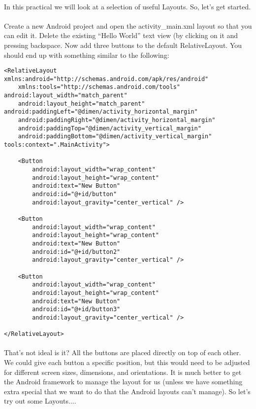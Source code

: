 \paragraph{} In this practical we will look at a selection of useful Layouts. So, let's get started.

\paragraph{} Create a new Android project and open the activity\_main.xml layout so that you can edit it. Delete the existing ``Hello World'' text view (by clicking on it and pressing backspace. Now add three buttons to the default RelativeLayout. You should end up with something similar to the following:

\begin{lstlisting}
<RelativeLayout xmlns:android="http://schemas.android.com/apk/res/android"
    xmlns:tools="http://schemas.android.com/tools" android:layout_width="match_parent"
    android:layout_height="match_parent" android:paddingLeft="@dimen/activity_horizontal_margin"
    android:paddingRight="@dimen/activity_horizontal_margin"
    android:paddingTop="@dimen/activity_vertical_margin"
    android:paddingBottom="@dimen/activity_vertical_margin" tools:context=".MainActivity">

    <Button
        android:layout_width="wrap_content"
        android:layout_height="wrap_content"
        android:text="New Button"
        android:id="@+id/button"
        android:layout_gravity="center_vertical" />

    <Button
        android:layout_width="wrap_content"
        android:layout_height="wrap_content"
        android:text="New Button"
        android:id="@+id/button2"
        android:layout_gravity="center_vertical" />

    <Button
        android:layout_width="wrap_content"
        android:layout_height="wrap_content"
        android:text="New Button"
        android:id="@+id/button3"
        android:layout_gravity="center_vertical" />

</RelativeLayout>
\end{lstlisting}
\paragraph{} That's not ideal is it? All the buttons are placed directly on top of each other. We could give each button a specific position, but this would need to be adjusted for different screen sizes, dimensions, and orientations. It is much better to get the Android framework to manage the layout for us (unless we have something extra special that we want to do that the Android layouts can't manage). So let's try out some Layouts....

